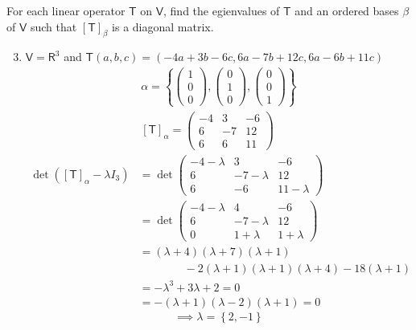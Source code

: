 For each linear operator $\mathsf{T}$ on $\mathsf{V}$, find the
egienvalues of $\mathsf{T}$ and an ordered bases $\beta$ of
$\mathsf{V}$ such that $[\mathsf{T}]_\beta$ is a diagonal matrix.
\begin{enumerate}
\setcounter{enumii}{2}
\item $\mathsf{V} = \mathsf{R}^3$ and $\mathsf{T}(a,b,c) =(-4a+
  3b-6c,6a-7b+12c,6a-6b+11c)$
\begin{gather}
\alpha =
\left\{\begin{pmatrix}1\\0\\0\end{pmatrix},\begin{pmatrix}0\\1\\0\end{pmatrix},\begin{pmatrix}0\\0\\1\end{pmatrix}\right\}\\
[\mathsf{T}]_\alpha = \begin{pmatrix}
-4 & 3 & -6\\
6 & -7 & 12\\
6 & 6 & 11
\end{pmatrix}
\end{gather}
\begin{align}
\det{([\mathsf{T}]_\alpha -\lambda I_3)} &= \det{\begin{pmatrix}
-4-\lambda & 3 & -6\\
6 & -7-\lambda & 12\\
6 & -6 & 11-\lambda
  \end{pmatrix}}\\
&=\det{\begin{pmatrix}
-4 -\lambda & 4 & -6 \\
6 & -7-\lambda & 12\\
0 & 1+\lambda & 1+\lambda
  \end{pmatrix}}\\
&= (\lambda+4)(\lambda+7)(\lambda+1)\\
&\qquad {} \qquad -2(\lambda+1)(\lambda+1)(\lambda+4)-18(\lambda+1)\\
&=-\lambda^3+3\lambda+2=0\\
&=-(\lambda+1)(\lambda-2)(\lambda+1) =0
\end{align}
\begin{equation}
\implies \lambda=\left\{2,-1\right\}
\end{equation}

\end{enumerate}
